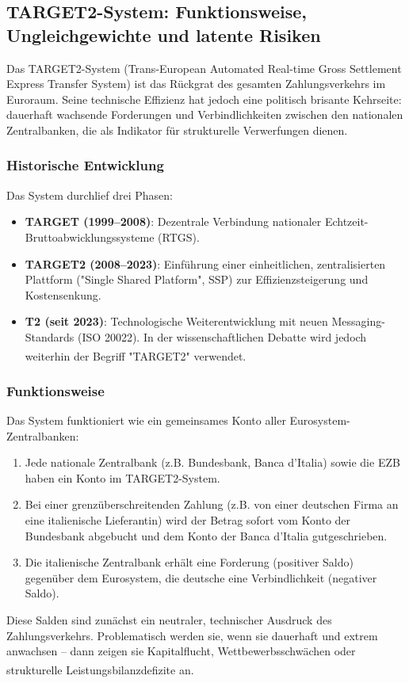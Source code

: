 \documentclass[12pt,a4paper]{article}
\newcommand{\footcite}[1]{\textsuperscript{\cite{#1}}}
\begin{document}
	\subsection{TARGET2-System: Funktionsweise, Ungleichgewichte und latente Risiken}
	
	Das TARGET2-System (Trans-European Automated Real-time Gross Settlement Express Transfer System) ist das Rückgrat des gesamten Zahlungsverkehrs im Euroraum. Seine technische Effizienz hat jedoch eine politisch brisante Kehrseite: dauerhaft wachsende Forderungen und Verbindlichkeiten zwischen den nationalen Zentralbanken, die als Indikator für strukturelle Verwerfungen dienen.
	
	\subsubsection{Historische Entwicklung}
	
	Das System durchlief drei Phasen:
	\begin{itemize}
		\item \textbf{TARGET (1999–2008)}: Dezentrale Verbindung nationaler Echtzeit-Bruttoabwicklungssysteme (RTGS).
		\item \textbf{TARGET2 (2008–2023)}: Einführung einer einheitlichen, zentralisierten Plattform ("Single Shared Platform", SSP) zur Effizienzsteigerung und Kostensenkung.
		\item \textbf{T2 (seit 2023)}: Technologische Weiterentwicklung mit neuen Messaging-Standards (ISO 20022). In der wissenschaftlichen Debatte wird jedoch weiterhin der Begriff "TARGET2" verwendet.\footcite{Natixis2025}
	\end{itemize}
	
	\subsubsection{Funktionsweise}
	
	Das System funktioniert wie ein gemeinsames Konto aller Eurosystem-Zentralbanken:
	\begin{enumerate}
		\item Jede nationale Zentralbank (z.B. Bundesbank, Banca d'Italia) sowie die EZB haben ein Konto im TARGET2-System.
		\item Bei einer grenzüberschreitenden Zahlung (z.B. von einer deutschen Firma an eine italienische Lieferantin) wird der Betrag sofort vom Konto der Bundesbank abgebucht und dem Konto der Banca d'Italia gutgeschrieben.
		\item Die italienische Zentralbank erhält eine Forderung (positiver Saldo) gegenüber dem Eurosystem, die deutsche eine Verbindlichkeit (negativer Saldo).
	\end{enumerate}
	Diese Salden sind zunächst ein neutraler, technischer Ausdruck des Zahlungsverkehrs. Problematisch werden sie, wenn sie dauerhaft und extrem anwachsen – dann zeigen sie Kapitalflucht, Wettbewerbsschwächen oder strukturelle Leistungsbilanzdefizite an.\footcite{Schularick2019}
	
\end{document}
